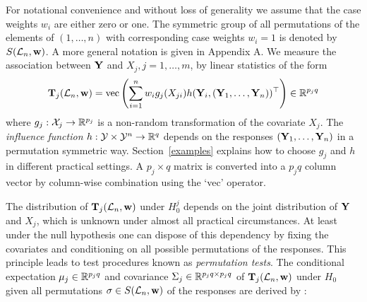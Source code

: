 For notational convenience and without loss of generality we assume that the
case weights $w_i$ are either zero or one. The symmetric group of all
permutations of  the elements of $(1, \dots, n)$ with corresponding case
weights $w_i = 1$ is denoted by $S(\mathcal{L}_n, \mathbf{w})$. A more general notation is
given in Appendix A. We measure the association between $\mathbf{Y}$ and $X_j, j = 1, \dots, m$, 
by linear statistics of the form
\begin{eqnarray} \label{linstat}
\mathbf{T}_j(\mathcal{L}_n, \mathbf{w}) = \text{vec} \left( \sum_{i=1}^n w_i g_j(X_{ji})
h(\mathbf{Y}_i, (\mathbf{Y}_1, \dots, \mathbf{Y}_n))^\top \right) \in \mathbb{R}^{p_jq}
\end{eqnarray}
where $g_j: \mathcal{X}_j \rightarrow \mathbb{R}^{p_j}$ is a non-random transformation of
the covariate $X_j$. The \textit{influence function} 
$h: \mathcal{Y} \times \mathcal{Y}^n \rightarrow
\mathbb{R}^q$ depends on the responses $(\mathbf{Y}_1, \dots, \mathbf{Y}_n)$ in a permutation
symmetric way. 
Section~\ref{examples} explains how to choose $g_j$ and $h$ in different 
practical settings. A $p_j \times q$ matrix is converted into a 
$p_jq$ column vector by column-wise combination using the `vec' operator. 

The distribution of $\mathbf{T}_j(\mathcal{L}_n, \mathbf{w})$ under $H_0^j$ depends on the joint
distribution of $\mathbf{Y}$ and $X_j$, which is unknown under almost all practical
circumstances. At least under the null hypothesis one can dispose of this
dependency by fixing the covariates and conditioning on all possible 
permutations of the responses. This principle leads to test procedures known
as \textit{permutation tests}. 
The conditional expectation $\mu_j \in \mathbb{R}^{p_jq}$ and covariance $\Sigma_j
\in \mathbb{R}^{p_jq \times p_jq}$ of $\mathbf{T}_j(\mathcal{L}_n, \mathbf{w})$ under $H_0$ given
all permutations $\sigma \in S(\mathcal{L}_n, \mathbf{w})$ of the responses are derived by
\cite{StrasserWeber1999}: 

